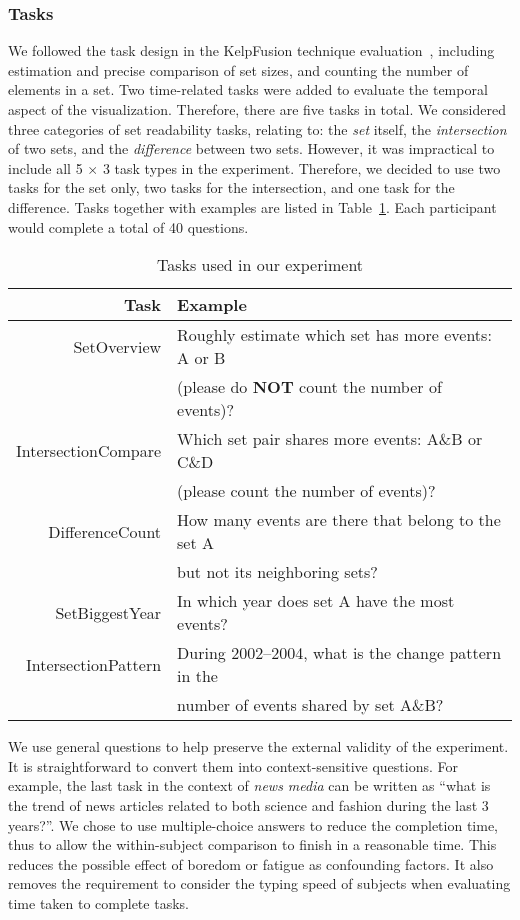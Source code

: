 \subsubsection{Tasks} We followed the task design in the KelpFusion technique evaluation~\cite{Meulemans2013}, including estimation and precise comparison of set sizes, and counting the number of elements in a set. Two time-related tasks were added to evaluate the temporal aspect of the  visualization. Therefore, there are five tasks in total. We considered three categories of set readability tasks, relating to: the \textit{set} itself, the \textit{intersection} of two sets, and the \textit{difference} between two sets. However, it was impractical to include all 5 $\times$ 3 task types in the experiment. Therefore, we decided to use two tasks for the set only, two tasks for the intersection, and one task for the difference. Tasks together with examples are listed in Table~\ref{table:tasks}. Each participant would complete a total of 40 questions.

\begin{table}[ht]
\centering
\sffamily\small
\caption{Tasks used in our experiment}
\label{table:tasks}
\begin{tabular}{rl}
	\toprule
	\textbf{Task} & \textbf{Example} \\ 
	\midrule
	SetOverview & Roughly estimate which set has more events:  A or B \\&(please do \textbf{NOT} count the number of events)? \\		
 	IntersectionCompare & Which set pair shares more events: A\&B or C\&D\\&  (please count the number of events)? \\ 
 	DifferenceCount & How many events are there that belong to the set A \\&but not its neighboring sets? \\ 
 	SetBiggestYear & In which year does set A have the most events? \\ 
 	IntersectionPattern & During 2002--2004, what is the change pattern in the \\& number of  events shared by set A\&B?\\
	\bottomrule
\end{tabular} 
\end{table}


We use general questions to help preserve the external validity of the experiment. It is straightforward to convert them into context-sensitive questions. For example, the last task in the context of \textit{news media} can be written as ``what is the trend of news articles related to both science and fashion during the last 3 years?''. We chose to use multiple-choice answers to reduce the completion time, thus to allow the within-subject comparison to finish in a reasonable time. This reduces the possible effect of boredom or fatigue as confounding factors. It also removes the requirement to consider the typing speed of subjects when evaluating time taken to complete tasks.

